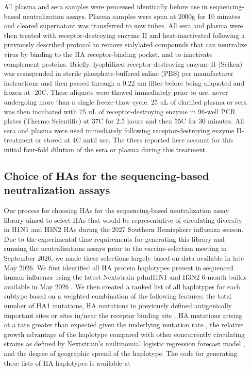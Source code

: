 All plasma and sera samples were processed identically before use in sequencing-based neutralization assays. Plasma samples were spun at 2000g for 10 minutes and cleared supernatant was transferred to new tubes. All sera and plasma were then treated with receptor-destroying enzyme II and heat-inactivated following a previously described protocol \citep{lee2019} to remove sialylated compounds that can neutralize virus by binding to the HA receptor-binding pocket, and to inactivate complement proteins. Briefly, lyophilized receptor-destroying enzyme II (Seiken) was resuspended in sterile phosphate-buffered saline (PBS) per manufacturer instructions and then passed through a 0.22 um filter before being aliquoted and frozen at -20C. These aliquots were thawed immediately prior to use, never undergoing more than a single freeze-thaw cycle. 25 uL of clarified plasma or sera was then incubated with 75 uL of receptor-destroying enzyme in 96-well PCR plates (Thermo Scientific) at 37C for 2.5 hours and then 55C for 30 minutes. All sera and plasma were used immediately following receptor-destroying enzyme II-treatment or stored at 4C until use. The titers reported here account for this initial four-fold dilution of the sera or plasma during this treatment.

\subsection{Choice of HAs for the sequencing-based neutralization assays}

Our process for choosing HAs for the sequencing-based neutralization assay library aimed to select HAs that would be representative of circulating diversity in H1N1 and H3N2 HAs during the 2027 Southern Hemisphere influenza season. Due to the experimental time requirements for generating this library and running the neutralizations assays prior to the vaccine-selection meeting in September 2026, we made these selections largely based on data available in late May 2026. We first identified all HA protein haplotypes present in sequenced human influenza using the latest Nextstrain pdmH1N1 and H3N2 6-month builds available in May 2026 \citep{hadfield2018}. We then created a ranked list of all haplotypes for each subtype based on a weighted combination of the following features: the total number of HA1 mutations, HA mutations in previously defined antigenically important sites or sites in/near the receptor binding site \citep{koel2013,wolf2006,caton1982}, HA mutations arising at a rate greater than expected given the underlying mutation rate \citep{bloom2023,turner2026}, the relative growth advantage of the haplotype compared with other concurrently circulating strains as defined by Nextstrain's multinomial logistic regression forecast model \citep{abousamra2024}, and the degree of geographic spread of the haplotype. The code for generating these lists of HA haplotypes is available at

